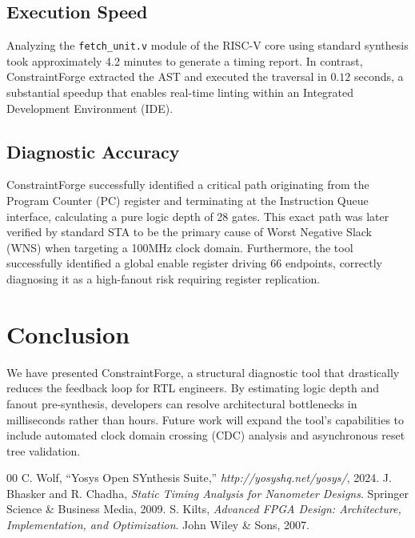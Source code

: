 \documentclass[conference]{IEEEtran}
\begin{document}
\subsection{Execution Speed}
Analyzing the \texttt{fetch\_unit.v} module of the RISC-V core using standard synthesis took approximately 4.2 minutes to generate a timing report. In contrast, ConstraintForge extracted the AST and executed the traversal in $0.12$ seconds, a substantial speedup that enables real-time linting within an Integrated Development Environment (IDE).

\subsection{Diagnostic Accuracy}
ConstraintForge successfully identified a critical path originating from the Program Counter (PC) register and terminating at the Instruction Queue interface, calculating a pure logic depth of 28 gates. This exact path was later verified by standard STA to be the primary cause of Worst Negative Slack (WNS) when targeting a 100MHz clock domain. Furthermore, the tool successfully identified a global enable register driving 66 endpoints, correctly diagnosing it as a high-fanout risk requiring register replication.

\section{Conclusion}
We have presented ConstraintForge, a structural diagnostic tool that drastically reduces the feedback loop for RTL engineers. By estimating logic depth and fanout pre-synthesis, developers can resolve architectural bottlenecks in milliseconds rather than hours. Future work will expand the tool's capabilities to include automated clock domain crossing (CDC) analysis and asynchronous reset tree validation.

\begin{thebibliography}{00}
 C. Wolf, ``Yosys Open SYnthesis Suite,'' \textit{http://yosyshq.net/yosys/}, 2024.
 J. Bhasker and R. Chadha, \textit{Static Timing Analysis for Nanometer Designs}. Springer Science \& Business Media, 2009.
 S. Kilts, \textit{Advanced FPGA Design: Architecture, Implementation, and Optimization}. John Wiley \& Sons, 2007.
\end{thebibliography}
\end{document}
